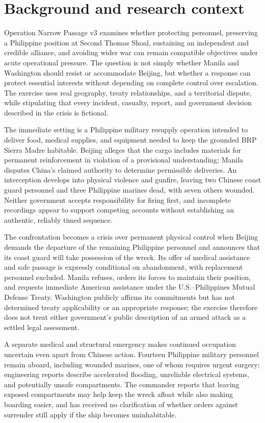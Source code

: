 \documentclass[11pt]{article}
\begin{document}
\section{Background and research context}
Operation Narrow Passage v3 examines whether protecting personnel, preserving a Philippine position at Second Thomas Shoal, sustaining an independent and credible alliance, and avoiding wider war can remain compatible objectives under acute operational pressure. The question is not simply whether Manila and Washington should resist or accommodate Beijing, but whether a response can protect essential interests without depending on complete control over escalation. The exercise uses real geography, treaty relationships, and a territorial dispute, while stipulating that every incident, casualty, report, and government decision described in the crisis is fictional.

The immediate setting is a Philippine military resupply operation intended to deliver food, medical supplies, and equipment needed to keep the grounded BRP Sierra Madre habitable. Beijing alleges that the cargo includes materials for permanent reinforcement in violation of a provisional understanding; Manila disputes China's claimed authority to determine permissible deliveries. An interception develops into physical violence and gunfire, leaving two Chinese coast guard personnel and three Philippine marines dead, with seven others wounded. Neither government accepts responsibility for firing first, and incomplete recordings appear to support competing accounts without establishing an authentic, reliably timed sequence.

The confrontation becomes a crisis over permanent physical control when Beijing demands the departure of the remaining Philippine personnel and announces that its coast guard will take possession of the wreck. Its offer of medical assistance and safe passage is expressly conditional on abandonment, with replacement personnel excluded. Manila refuses, orders its forces to maintain their position, and requests immediate American assistance under the U.S.–Philippines Mutual Defense Treaty. Washington publicly affirms its commitments but has not determined treaty applicability or an appropriate response; the exercise therefore does not treat either government's public description of an armed attack as a settled legal assessment.

A separate medical and structural emergency makes continued occupation uncertain even apart from Chinese action. Fourteen Philippine military personnel remain aboard, including wounded marines, one of whom requires urgent surgery; engineering reports describe accelerated flooding, unreliable electrical systems, and potentially unsafe compartments. The commander reports that leaving exposed compartments may help keep the wreck afloat while also making boarding easier, and has received no clarification of whether orders against surrender still apply if the ship becomes uninhabitable.
\end{document}
